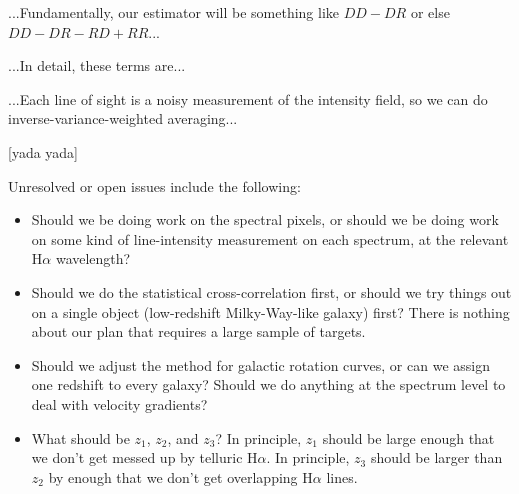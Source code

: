 \documentclass[12pt, letterpaper]{article}
\begin{document}
...Fundamentally, our estimator will be something like $DD - DR$ or else
$DD - DR - RD + RR$...

...In detail, these terms are...

...Each line of sight is a noisy measurement of the intensity field, so
we can do inverse-variance-weighted averaging...

[yada yada]

Unresolved or open issues include the following:
\begin{itemize}
\item
Should we be doing work on the spectral pixels, or should we be doing
work on some kind of line-intensity measurement on each spectrum, at
the relevant H$\alpha$ wavelength?
\item
Should we do the statistical cross-correlation first, or should we try
things out on a single object (low-redshift Milky-Way-like galaxy)
first?  There is nothing about our plan that requires a large sample
of targets.
\item
Should we adjust the method for galactic rotation curves, or can we
assign one redshift to every galaxy?  Should we do anything at the
spectrum level to deal with velocity gradients?
\item
What should be $z_1$, $z_2$, and $z_3$?  In principle, $z_1$ should be
large enough that we don't get messed up by telluric H$\alpha$.  In
principle, $z_3$ should be larger than $z_2$ by enough that we don't
get overlapping H$\alpha$ lines.
\end{itemize}
\end{document}
